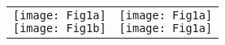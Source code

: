 \documentclass[varwidth=21em]{standalone}
\begin{document}
\begin{tabular}[c]{p{23em}p{50em}}
\shortstack[c]{
 \texttt{[image: Fig1a]} \\[0.3cm]
\texttt{[image: Fig1b]}}
& 
\shortstack[c]{
\texttt{[image: Fig1a]}\\[0.3cm]
\texttt{[image: Fig1a]}
}
\end{tabular}
\end{document}
